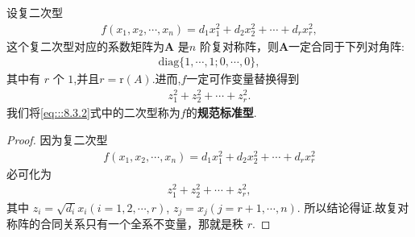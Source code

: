 \documentclass[../../main.tex]{subfiles}
\begin{document}
\begin{theorem}[复二次型的规范标准型]\label{theorem:复二次型的规范标准型}
设复二次型
\begin{align*}
f(x_1,x_2,\cdots,x_n)=d_1x_1^2 + d_2x_2^2 + \cdots + d_rx_r^2,
\end{align*}
这个复二次型对应的系数矩阵为$\boldsymbol{A}$ 是$n$ 阶复对称阵，则$\boldsymbol{A}$一定合同于下列对角阵:
\begin{align}
\mathrm{diag}\{1,\cdots,1;0,\cdots,0\},\label{eq:::8.3.3}
\end{align}
其中有 $r$ 个 $1$,并且$r=\mathrm{r}\left( A \right)$.进而,$f$一定可作变量替换得到
\begin{align}
z_1^2 + z_2^2 + \cdots + z_r^2.\label{eq:::8.3.2}
\end{align}
我们将\eqref{eq:::8.3.2}式中的二次型称为$f$的\textbf{规范标准型}.
\end{theorem}
\begin{proof}
因为复二次型
\begin{align*}
f(x_1,x_2,\cdots,x_n)=d_1x_1^2 + d_2x_2^2 + \cdots + d_rx_r^2
\end{align*}
必可化为
\begin{align*}
z_1^2 + z_2^2 + \cdots + z_r^2,
\end{align*}
其中 $z_i = \sqrt{d_i}x_i (i = 1,2,\cdots,r)$, $z_j = x_j (j = r + 1,\cdots,n)$. 所以结论得证.故复对称阵的合同关系只有一个全系不变量，那就是秩 $r$. 
\end{proof}
\end{document}
